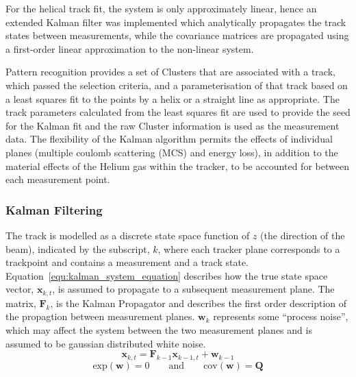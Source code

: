    For the helical track fit, the system is only approximately linear, hence an extended Kalman filter was implemented which analytically propagates the track states between measurements, while the covariance matrices are propagated using a first-order linear approximation to the non-linear system.

   Pattern recognition provides a set of Clusters that are associated with a track, which passed the selection criteria, and a parameterisation of that track based on a least squares fit to the points by a helix or a straight line as appropriate. The track parameters calculated from the least squares fit are used to provide the seed for the Kalman fit and the raw Cluster information is used as the measurement data. The flexibility of the Kalman algorithm permits the effects of individual planes (multiple coulomb scattering (MCS) and energy loss), in addition to the material effects of the Helium gas within the tracker, to be accounted for between each measurement point.

     \subsubsection{Kalman Filtering}

     The track is modelled as a discrete state space function of $z$ (the direction of the beam), indicated by the subscript, $k$, where each tracker plane corresponds to a trackpoint and contains a measurement and a track state. Equation~\ref{equ:kalman_system_equation} describes how the true state space vector, $\mathbf{x}_{k,t}$, is assumed to propagate to a subsequent measurement plane. The matrix, $\mathbf{F}_k$, is the Kalman Propagator and describes the first order description of the propagtion between measurement planes. $\mathbf{w}_k$ represents some ``process noise'', which may affect the system between the two measurement planes and is assumed to be gaussian distributed white noise.
    \begin{equation}
      \mathbf{x}_{k,t} = \mathbf{F}_{k-1}\mathbf{x}_{k-1,t} + \mathbf{w}_{k-1}
      \label{equ:kalman_system_equation}
    \end{equation}
    \begin{equation*}
      \textrm{exp}(\mathbf{w}) = 0 \quad\quad \textrm{and} \quad\quad \textrm{cov}(\mathbf{w}) = \mathbf{Q}
    \end{equation*}
     
